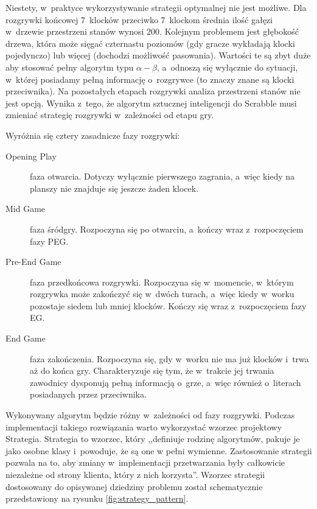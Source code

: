 \documentclass[a4paper,twocolumn,11pt]{article}
\theoremstyle{definition}
\begin{document}
Niestety, w~praktyce wykorzystywanie strategii optymalnej nie jest możliwe. Dla rozgrywki końcowej 7~klocków przeciwko 7~klockom średnia ilość gałęzi w~drzewie przestrzeni stanów wynosi 200. Kolejnym problemem jest głębokość drzewa, która może sięgać czternastu poziomów (gdy gracze wykładają klocki pojedynczo) lub więcej (dochodzi możliwość pasowania). Wartości te są zbyt duże aby stosować pełny algorytm typu $\alpha - \beta$, a~odnoszą się wyłącznie do sytuacji, w~której posiadamy pełną informację o~rozgrywce (to znaczy znane są klocki przeciwnika). Na pozostałych etapach rozgrywki analiza przestrzeni stanów nie jest opcją. Wynika z~tego, że algorytm sztucznej inteligencji do Scrabble musi zmieniać strategię rozgrywki w~zależności od etapu gry.

Wyróżnia się cztery zasadnicze fazy rozgrywki: \cite{sheppard_maven}

\begin{description}
	\item[Opening Play\footnotemark]  faza otwarcia. Dotyczy wyłącznie pierwszego zagrania, a~więc kiedy na planszy nie znajduje się jeszcze żaden klocek.
	\item[Mid Game] faza śródgry. Rozpoczyna się po otwarciu, a~kończy wraz z~rozpoczęciem fazy PEG.
	\item[Pre-End Game] faza przedkońcowa rozgrywki. Rozpoczyna się w~momencie, w~którym rozgrywka może zakończyć się w~dwóch turach, a~więc kiedy w~worku pozostaje siedem lub mniej klocków. Kończy się wraz z~rozpoczęciem fazy EG.
	\item[End Game] faza zakończenia. Rozpoczyna się, gdy w~worku nie ma już klocków i~trwa aż do końca gry. Charakteryzuje się tym, że w~trakcie jej trwania zawodnicy dysponują pełną informacją o~grze, a~więc również o~literach posiadanych przez przeciwnika.
\end{description}

Wykonywany algorytm będzie różny w~zależności od fazy rozgrywki. Podczas implementacji takiego rozwiązania warto wykorzystać wzorzec projektowy Strategia. Strategia to wzorzec, który ,,definiuje rodzinę algorytmów, pakuje je jako osobne klasy i~powoduje, że są one w pełni wymienne. Zastosowanie strategii pozwala na to, aby zmiany w~implementacji przetwarzania były całkowicie niezależne od strony klienta, który z nich korzysta''. \cite{strategy_pattern_definition} Wzorzec strategii dostosowany do opisywanej dziedziny problemu został schematycznie przedstawiony na rysunku \ref{fig:strategy_pattern}.
\end{document}
